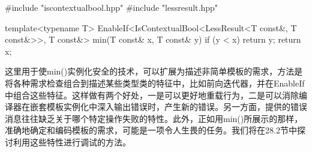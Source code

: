 \begin{cpp}
#include "iscontextualbool.hpp"
#include "lessresult.hpp"

template<typename T>
EnableIf<IsContextualBool<LessResult<T const&, T const&>>,
		T const&>
min(T const& x, T const& y)
{
	if (y < x) {
		return y;
	}
	return x;
}
\end{cpp}

这里用于使min()实例化安全的技术，可以扩展为描述非简单模板的需求，方法是将各种需求检查组合到描述某些类型类的特征中，比如前向迭代器，并在EnableIf中组合这些特征。这样做有两个好处，一是可以更好地重载行为，二是可以消除编译器在嵌套模板实例化中深入输出错误时，产生新的错误。另一方面，提供的错误消息往往缺乏关于哪个特定操作失败的特性。此外，正如用min()所展示的那样，准确地确定和编码模板的需求，可能是一项令人生畏的任务。我们将在28.2节中探讨利用这些特性进行调试的方法。






